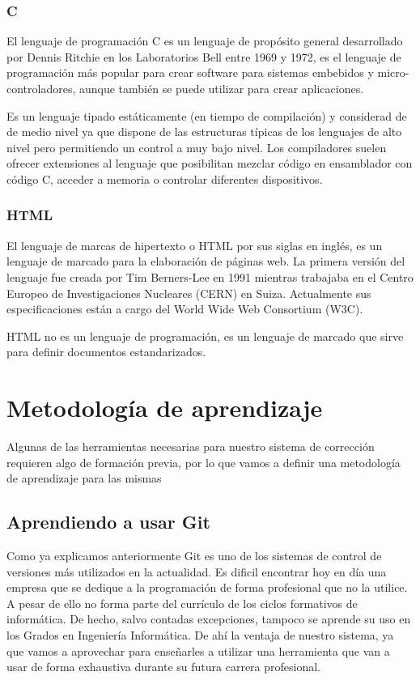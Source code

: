 \subsubsection{C}

El lenguaje de programación C es un lenguaje de propósito general desarrollado por Dennis Ritchie en los Laboratorios Bell entre 1969 y 1972, es el lenguaje de programación más popular para crear software para sistemas embebidos y micro-controladores, aunque también se puede utilizar para crear aplicaciones.

\bigskip
Es un lenguaje tipado estáticamente (en tiempo de compilación) y considerad de de medio nivel ya que dispone de las estructuras típicas de los lenguajes de alto nivel pero permitiendo un control a muy bajo nivel. Los compiladores suelen ofrecer extensiones al lenguaje que posibilitan mezclar código en ensamblador con código C, acceder a memoria o controlar diferentes dispositivos.

\subsubsection{HTML}

El lenguaje de marcas de hipertexto o HTML por sus siglas en inglés, es un lenguaje de marcado para la elaboración de páginas web. La primera versión del lenguaje fue creada por Tim Berners-Lee en 1991 mientras trabajaba en el Centro Europeo de Investigaciones Nucleares (CERN) en Suiza. Actualmente sus especificaciones están a cargo del World Wide Web Consortium (W3C).

\bigskip
HTML no es un lenguaje de programación, es un lenguaje de marcado que sirve para definir documentos estandarizados.

\section{Metodología de aprendizaje}

Algunas de las herramientas necesarias para nuestro sistema de corrección requieren algo de formación previa, por lo que vamos a definir una metodología de aprendizaje para las mismas

\subsection{Aprendiendo a usar Git}

Como ya explicamos anteriormente Git es uno de los sistemas de control de versiones más utilizados en la actualidad. Es dificil encontrar hoy en día una empresa que se dedique a la programación de forma profesional que no la utilice. A pesar de ello no forma parte del currículo de los ciclos formativos de informática. De hecho, salvo contadas excepciones, tampoco se aprende su uso en los Grados en Ingeniería Informática. De ahí la ventaja de nuestro sistema, ya que vamos a aprovechar para enseñarles a utilizar una herramienta que van a usar de forma exhaustiva durante su futura carrera profesional.


